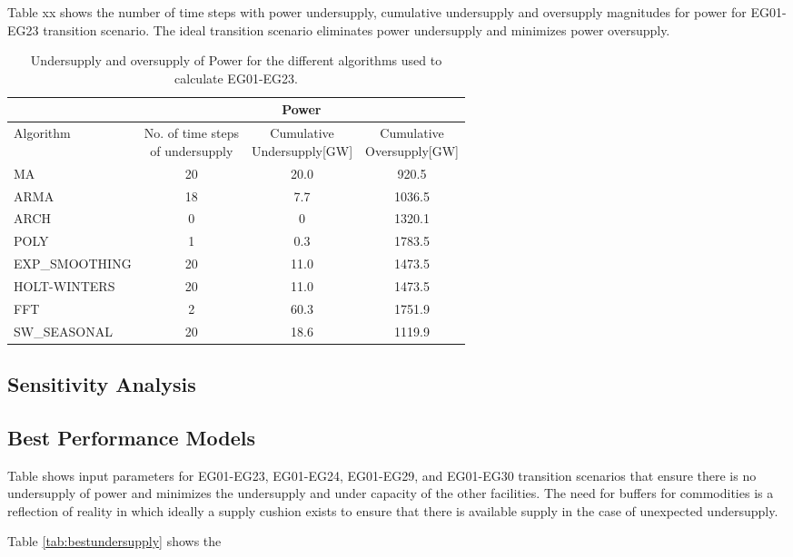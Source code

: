 Table xx shows the number of time steps with power undersupply, 
cumulative undersupply and oversupply magnitudes for power for 
EG01-EG23 transition scenario. 
The ideal transition scenario eliminates power undersupply and 
minimizes power oversupply. 

\begin{table}[]
	\centering
	\caption {Undersupply and oversupply of Power for the different algorithms used to calculate EG01-EG23.}
	\label{tab:23-power}
	\begin{tabular}{|l|c|c|c|}
		\hline
		& \multicolumn{3}{c|}{Power} \\ \hline
		Algorithm & \shortstack{No. of time steps\\of undersupply}  & 
		\shortstack{Cumulative\\Undersupply[GW]}  & \shortstack{Cumulative\\Oversupply[GW]} \\ \hline
		MA        & 20 	& 20.0  &  920.5   \\ \hline
		ARMA      & 18 	&  7.7  &  1036.5  \\ \hline
		ARCH      &  0 	&   0  	&  1320.1  \\ \hline
		POLY      &  1 	&  0.3 	&  1783.5  \\ \hline
		EXP\_SMOOTHING 	& 20 	& 11.0 & 1473.5 \\ \hline
		HOLT-WINTERS  	& 20 	& 11.0 & 1473.5 \\ \hline
		FFT       & 2 	& 60.3 	& 1751.9 	\\ \hline
		SW\_SEASONAL    & 20 	& 18.6 	& 1119.9 	\\ \hline
	\end{tabular}
\end{table}

\subsection{Sensitivity Analysis}

\subsection{Best Performance Models}
Table %
shows \deploy input parameters for
EG01-EG23, EG01-EG24, EG01-EG29, and EG01-EG30 transition scenarios
that ensure there is no undersupply of power and minimizes 
the undersupply and under capacity of the other facilities. 
The need for buffers for commodities is a reflection of reality
in which ideally a supply cushion exists to ensure that there 
is available supply in the case of unexpected undersupply. 

Table \ref{tab:bestundersupply} shows the

